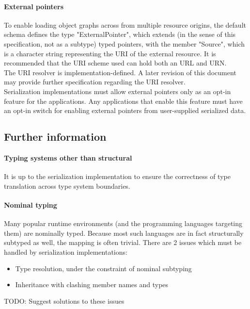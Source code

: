 \paragraph{External pointers}
To enable loading object graphs across from multiple resource origins, the default schema defines the type "ExternalPointer", which extends (in the sense of this specification, not as a subtype) typed pointers, with the member "Source", which is a character string representing the URI of the external resource. It is recommended that the URI scheme used can hold both an URL and URN.\\
The URI resolver is implementation-defined. A later revision of this document may provide further specification regarding the URI resolver.\\
Serialization implementations must allow external pointers only as an opt-in feature for the applications. Any applications that enable this feature must have an opt-in switch for enabling external pointers from user-supplied serialized data.\\
\subsection{Further information}
\paragraph{Typing systems other than structural}
It is up to the serialization implementation to ensure the correctness of type translation across type system boundaries.
\paragraph{Nominal typing} Many popular runtime environments (and the programming languages targeting them) are nominally typed. Because most such languages are in fact structurally subtyped as well, the mapping is often trivial. There are 2 issues which must be handled by serialization implementations:
\begin{itemize}
	\item Type resolution, under the constraint of nominal subtyping
	\item Inheritance with clashing member names and types
\end{itemize}
TODO: Suggest solutions to these issues
